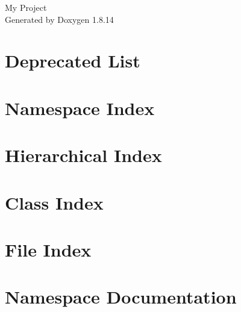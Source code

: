 \documentclass[twoside]{book}
\newcommand{\+}{\discretionary{\mbox{\scriptsize$\hookleftarrow$}}{}{}}
\newcommand{\clearemptydoublepage}{%
  \newpage{\pagestyle{empty}\cleardoublepage}%
}
\begin{document}
\hypersetup{pageanchor=false,
             bookmarksnumbered=true,
             pdfencoding=unicode
            }
\begin{titlepage}
\vspace*{7cm}
\begin{center}%
{\Large My Project }\\
\vspace*{1cm}
{\large Generated by Doxygen 1.8.14}\\
\end{center}
\end{titlepage}
\clearemptydoublepage
{}
\tableofcontents
\clearemptydoublepage
{}
\hypersetup{pageanchor=true}

\chapter{Deprecated List}
\label{deprecated}

\chapter{Namespace Index}

\chapter{Hierarchical Index}

\chapter{Class Index}

\chapter{File Index}

\chapter{Namespace Documentation}



\end{document}
